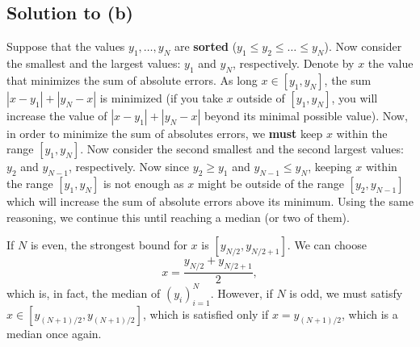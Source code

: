 \documentclass[10pt]{article}
\begin{document}
\subsection*{Solution to (b)}
Suppose that the values $y_1, \dots, y_N$ are \textbf{sorted} ($y_1 \leq y_2 \leq \dots \leq y_N$). Now consider the smallest and the largest values: $y_1$ and $y_N$, respectively. Denote by $x$ the value that minimizes the sum of absolute errors. As long $x \in [y_1, y_N]$, the sum $|x - y_1| + |y_N - x|$ is minimized (if you take $x$ outside of $[y_1, y_N]$, you will increase the value of $|x - y_1| + |y_N - x|$ beyond its minimal possible value). Now, in order to minimize the sum of absolutes errors, we \textbf{must} keep $x$ within the range $[y_1, y_N]$. Now consider the second smallest and the second largest values: $y_2$ and $y_{N - 1}$, respectively. Now since $y_2 \geq y_1$ and $y_{N - 1} \leq y_N$, keeping $x$ within the range $[y_1, y_N]$ is not enough as $x$ might be outside of the range $[y_2, y_{N - 1}]$ which will increase the sum of absolute errors above its minimum. Using the same reasoning, we continue this until reaching a median (or two of them).

If $N$ is even, the strongest bound for $x$ is $[y_{N / 2}, y_{N / 2 + 1}]$. We can choose
\[
x = \frac{y_{N / 2} + y_{N / 2 + 1}}{2},
\]
which is, in fact, the median of $(y_i)_{i = 1}^N$. However, if $N$ is odd, we must satisfy $x \in [y_{(N + 1) / 2}, y_{(N + 1) / 2}]$, which is satisfied only if $x = y_{(N + 1) / 2}$, which is a median once again.
\end{document}

